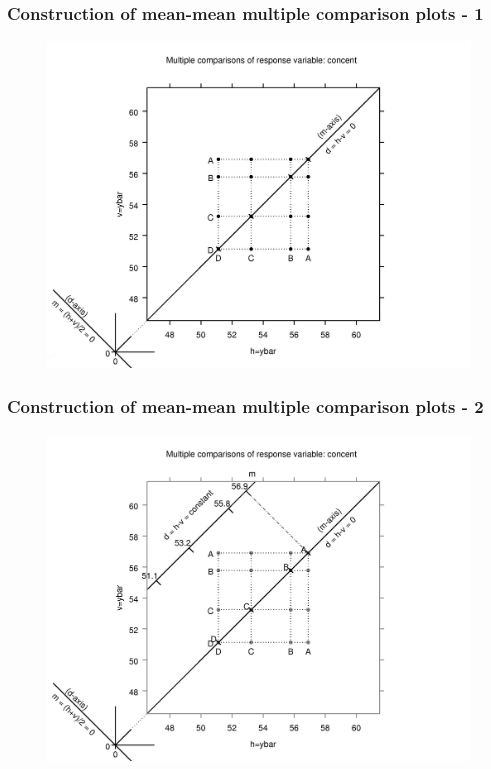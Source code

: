 \documentclass{beamer}
\begin{document}
\begin{frame}
\frametitle{Construction of mean-mean multiple comparison plots - 1}
\begin{figure}
	\centering
		\includegraphics[width=1.00\textwidth]{mmc1-a.jpg}
	\label{fig:MMC1}
\end{figure}
\end{frame}

\begin{frame}
\frametitle{Construction of mean-mean multiple comparison plots - 2}
\begin{figure}
	\centering
		\includegraphics[width=1.00\textwidth]{mmc1-b0.jpg}
	\label{fig:MMC2}
\end{figure}
\end{frame}
\end{document}
